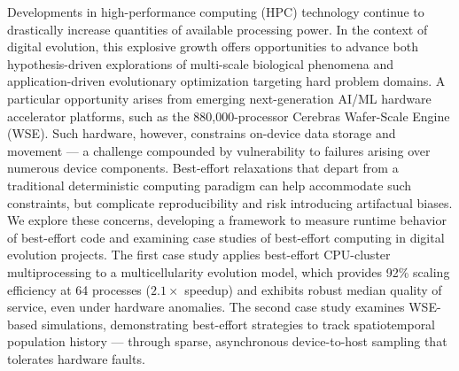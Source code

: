 {%
Developments in high-performance computing (HPC) technology continue to drastically increase quantities of available processing power.
In the context of digital evolution, this explosive growth offers opportunities to advance both hypothesis-driven explorations of multi-scale biological phenomena and application-driven evolutionary optimization targeting hard problem domains.
A particular opportunity arises from emerging next-generation AI/ML hardware accelerator platforms, such as the 880,000-processor Cerebras Wafer-Scale Engine (WSE).
Such hardware, however, constrains on-device data storage and movement --- a challenge compounded by vulnerability to failures arising over numerous device components.
Best-effort relaxations that depart from a traditional deterministic computing paradigm can help accommodate such constraints, but complicate reproducibility and risk introducing artifactual biases.
We explore these concerns, developing a framework to measure runtime behavior of best-effort code and examining case studies of best-effort computing in digital evolution projects.
The first case study applies best-effort CPU-cluster multiprocessing to a multicellularity evolution model, which provides 92\% scaling efficiency at 64 processes ($2.1\times$ speedup) and exhibits robust median quality of service, even under hardware anomalies.
The second case study examines WSE-based simulations, demonstrating best-effort strategies to track spatiotemporal population history --- through sparse, asynchronous device-to-host sampling that tolerates hardware faults.
}
